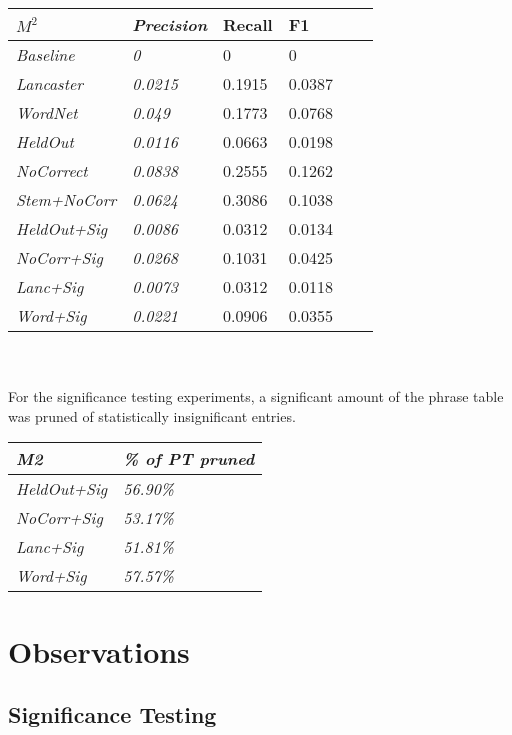 \documentclass[11pt,letterpaper]{article}
\begin{document}
\begin{tabular}{ |l|l|l|l|l|l| }
\hline
\textit{$M^2$} & \textit{Precision} & Recall & F1 \\ \hline
\textit{Baseline} & \textit{0} & 0 & 0 \\ \hline
\textit{Lancaster} & \textit{0.0215} & 0.1915 & 0.0387 \\ \hline
\textit{WordNet} & \textit{0.049} & 0.1773 & 0.0768 \\ \hline
\textit{HeldOut} & \textit{0.0116} & 0.0663 & 0.0198 \\ \hline
\textit{NoCorrect} & \textit{0.0838} & 0.2555 & 0.1262 \\ \hline
\textit{Stem+NoCorr} & \textit{0.0624} & 0.3086 & 0.1038 \\ \hline
\textit{HeldOut+Sig} & \textit{0.0086} & 0.0312 & 0.0134 \\ \hline
\textit{NoCorr+Sig} & \textit{0.0268} & 0.1031 & 0.0425 \\ \hline
\textit{Lanc+Sig} & \textit{0.0073} & 0.0312 & 0.0118 \\ \hline
\textit{Word+Sig} & \textit{0.0221} & 0.0906 & 0.0355 \\ \hline
\end{tabular}
\\\\

For the significance testing experiments, a significant amount of the phrase table was pruned of statistically insignificant entries. \\

\begin{tabular}{|l|l|}
\hline
\textit{M2} & \textit{\% of PT pruned} \\ \hline
\textit{HeldOut+Sig} & \textit{56.90\%} \\ \hline
\textit{NoCorr+Sig} & \textit{53.17\%} \\ \hline
\textit{Lanc+Sig} & \textit{51.81\%} \\ \hline
\textit{Word+Sig} & \textit{57.57\%} \\ \hline
\end{tabular}

\section{Observations}

\subsection{Significance Testing}
\end{document}
